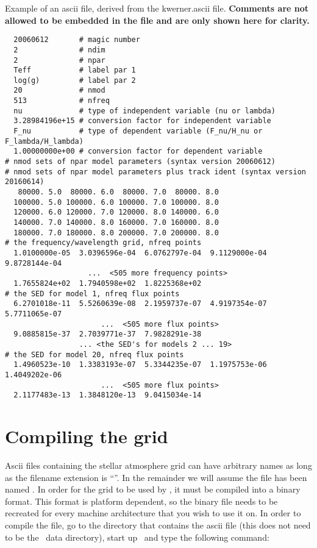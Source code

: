 \begin{table}
  \caption[Example of an ascii file, derived from the kwerner.ascii file.]
  {Example of an ascii file, derived from the kwerner.ascii file.
    {\bf Comments are not allowed to be embedded in the file and are only shown here for clarity.}
    \label{def}}
  \small
\begin{verbatim}
  20060612       # magic number
  2              # ndim
  2              # npar
  Teff           # label par 1
  log(g)         # label par 2
  20             # nmod
  513            # nfreq
  nu             # type of independent variable (nu or lambda)
  3.28984196e+15 # conversion factor for independent variable
  F_nu           # type of dependent variable (F_nu/H_nu or F_lambda/H_lambda)
  1.00000000e+00 # conversion factor for dependent variable
# nmod sets of npar model parameters (syntax version 20060612)
# nmod sets of npar model parameters plus track ident (syntax version 20160614)
   80000. 5.0  80000. 6.0  80000. 7.0  80000. 8.0
  100000. 5.0 100000. 6.0 100000. 7.0 100000. 8.0
  120000. 6.0 120000. 7.0 120000. 8.0 140000. 6.0
  140000. 7.0 140000. 8.0 160000. 7.0 160000. 8.0
  180000. 7.0 180000. 8.0 200000. 7.0 200000. 8.0
# the frequency/wavelength grid, nfreq points
  1.0100000e-05  3.0396596e-04  6.0762797e-04  9.1129000e-04  9.8728144e-04
                   ...  <505 more frequency points>
  1.7655824e+02  1.7940598e+02  1.8225368e+02
# the SED for model 1, nfreq flux points
  6.2701018e-11  5.5260639e-08  2.1959737e-07  4.9197354e-07  5.7711065e-07
                      ...  <505 more flux points>
  9.0885815e-37  2.7039771e-37  7.9828291e-38
                 ... <the SED's for models 2 ... 19>
# the SED for model 20, nfreq flux points
  1.4960523e-10  1.3383193e-07  5.3344235e-07  1.1975753e-06  1.4049202e-06
                      ...  <505 more flux points>
  2.1177483e-13  1.3848120e-13  9.0415034e-14
\end{verbatim}
\end{table}

\section{Compiling the grid}
\label{compiling}

Ascii files containing the stellar atmosphere grid can have arbitrary names as
long as the filename extension is ``''. In the remainder we
will assume the file has been named . In order for
the grid to be used by \Cloudy, it must be compiled into a binary format. This
format is platform dependent, so the binary file needs to be recreated for
every machine architecture that you wish to use it on. In order to compile the
file, go to the directory that contains the ascii file (this does not need to
be the \Cloudy\ data directory), start up \Cloudy\ and type the following command:

